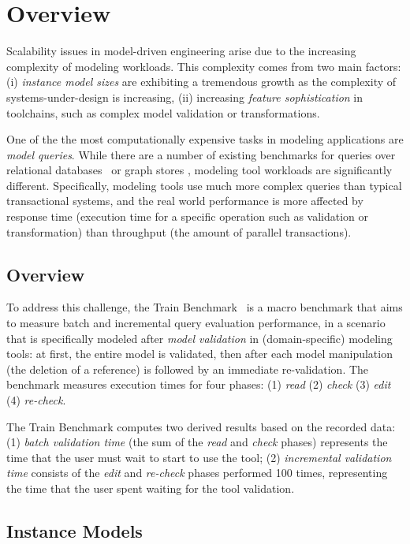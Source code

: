 \chapter{Overview}

Scalability issues in model-driven engineering arise due to the increasing complexity of modeling workloads. This complexity comes from two main factors: (i) \emph{instance model sizes} are exhibiting a tremendous growth as the complexity of systems-under-design is increasing, (ii) increasing \emph{feature sophistication} in toolchains, such as complex model validation or transformations.

One of the the most computationally expensive tasks in modeling applications are \emph{model queries}. While there are a number of existing benchmarks for queries over relational databases~\cite{tpc-c} or graph stores \cite{BSBM, SP2Bench}, modeling tool workloads are significantly different. Specifically, modeling tools use much more complex queries than typical transactional systems, and the real world performance is more affected by response time (\ie execution time for a specific operation such as validation
or transformation) than throughput (\ie the amount of parallel transactions). 

\section{Overview}
To address this challenge, the Train Benchmark~\cite{SCP2014,TBwebsite} is a macro benchmark that aims to measure batch and incremental query evaluation performance, in a scenario that is specifically modeled after \emph{model validation} in (domain-specific) modeling tools: at first, the entire model is validated, then after each model manipulation (\eg the deletion of a reference) is followed by an immediate re-validation. The benchmark measures execution times for four phases: (1) \emph{read} (2) \emph{check} (3) \emph{edit} (4) \emph{re-check}.

The Train Benchmark computes two derived results based on the recorded data: (1) \emph{batch validation time} (the sum of the \emph{read} and \emph{check} phases) represents the time that the user must wait to start to use the tool; (2) \emph{incremental validation time} consists of the \emph{edit} and \emph{re-check} phases performed 100 times, representing the time that the user spent waiting for the tool validation.

\section{Instance Models}

